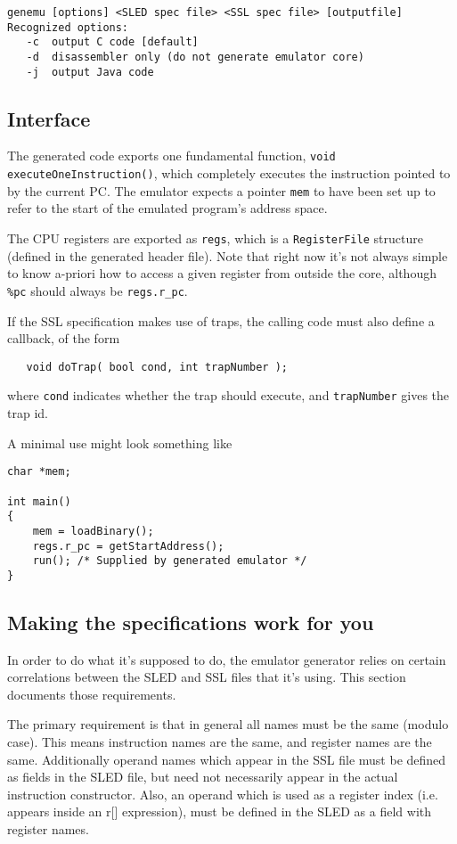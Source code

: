 \begin{verbatim}
genemu [options] <SLED spec file> <SSL spec file> [outputfile]
Recognized options:
   -c  output C code [default]
   -d  disassembler only (do not generate emulator core)
   -j  output Java code
\end{verbatim}


\subsection{Interface}
 
The generated code exports one fundamental function, 
\texttt{void executeOneInstruction()}, which completely executes the 
instruction pointed to by the current PC. 
The emulator expects a pointer \texttt{mem} to have been
set up to refer to the start of the emulated program's address space.

The CPU registers are exported as \texttt{regs}, which is a 
\texttt{RegisterFile} structure (defined in the generated header file). 
Note that right now it's not always simple to know a-priori how to 
access a given register from outside the core, although \texttt{\%pc} 
should always be \texttt{regs.r\_pc}. 

If the SSL specification makes use of traps, the calling code must also define
a callback, of the form

\begin{verbatim}
   void doTrap( bool cond, int trapNumber );
\end{verbatim}
where \texttt{cond} indicates whether the trap should execute, and 
\texttt{trapNumber} gives the trap id.

A minimal use might look something like
\begin{verbatim}
char *mem;

int main()
{
    mem = loadBinary();
    regs.r_pc = getStartAddress();
    run(); /* Supplied by generated emulator */
}
\end{verbatim}


\subsection{Making the specifications work for you}
In order to do what it's supposed to do, the emulator generator relies on
certain correlations between the SLED and SSL files that it's using. This
section documents those requirements.

The primary requirement is that in general all names must be the same (modulo
case). This means instruction names are the same, and register names are the 
same. Additionally operand names which appear in the SSL file must be defined
as fields in the SLED file, but need not necessarily appear in the actual 
instruction constructor. Also, an operand which is used as a register index 
(i.e. appears inside an r[] expression), must be defined in the SLED as a 
field with register names.

